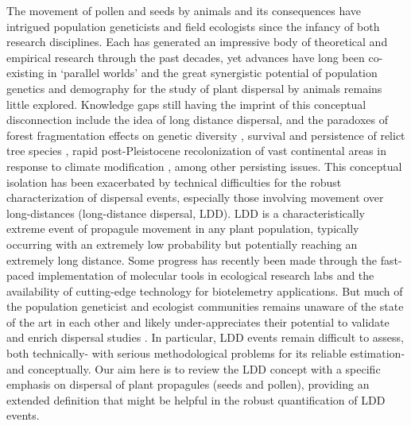 \documentclass[a4paper, 12pt]{article}
\begin{document}
\begin{linenumbers}
The movement of pollen and seeds by animals and its consequences have intrigued population geneticists and field ecologists since the infancy of both research disciplines. Each has generated an impressive body of theoretical and empirical research through the past decades, yet advances have long been co-existing in ‘parallel worlds’ and the great synergistic potential of population genetics and demography for the study of plant dispersal by animals remains little explored. Knowledge gaps still having the imprint of this conceptual disconnection include the idea of long distance dispersal, and the paradoxes of forest fragmentation effects on genetic diversity \citep{Kramer:2008kg}, survival and persistence of relict tree species \citep{Hampe:2011bv}, rapid post-Pleistocene recolonization of vast continental areas in response to climate modification \citep{Clark:1998aa,Clark:1998vi}, among other persisting issues. This conceptual isolation has been exacerbated by technical difficulties for the robust characterization of dispersal events, especially those involving movement over long-distances (long-distance dispersal, LDD). LDD is a characteristically extreme event of propagule movement in any plant population, typically occurring with an extremely low probability but potentially reaching an extremely long distance. Some progress has recently been made through the fast-paced implementation of molecular tools in ecological research labs and the availability of cutting-edge technology for biotelemetry applications. But much of the population geneticist and ecologist communities remains unaware of the state of the art in each other and likely under-appreciates their potential to validate and enrich dispersal studies \citep{Jones:2008il}. In particular, LDD events remain difficult to assess, both technically- with serious methodological problems for its reliable estimation- and conceptually. Our aim here is to review the LDD concept with a specific emphasis on dispersal of plant propagules (seeds and pollen), providing an extended definition that might be helpful in the robust quantification of LDD events.   


\end{linenumbers}
\end{document}
